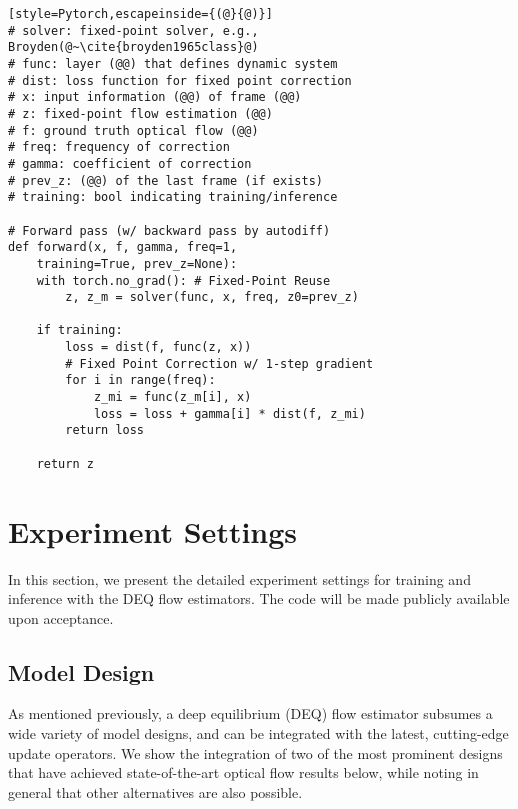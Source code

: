 \documentclass[10pt,twocolumn,letterpaper]{article}
\begin{document}
\begin{algorithm}[t]
\caption{DEQ flow (PyTorch-style). Note that we reuse the fixed point and perform fixed-point correction.}
\label{alg:deq-torch-short}
\begin{lstlisting}[style=Pytorch,escapeinside={(@}{@)}]
# solver: fixed-point solver, e.g., Broyden(@~\cite{broyden1965class}@)
# func: layer (@@) that defines dynamic system
# dist: loss function for fixed point correction
# x: input information (@@) of frame (@@)
# z: fixed-point flow estimation (@@)
# f: ground truth optical flow (@@)
# freq: frequency of correction
# gamma: coefficient of correction
# prev_z: (@@) of the last frame (if exists)
# training: bool indicating training/inference

# Forward pass (w/ backward pass by autodiff)
def forward(x, f, gamma, freq=1, 
    training=True, prev_z=None):
    with torch.no_grad(): # Fixed-Point Reuse
        z, z_m = solver(func, x, freq, z0=prev_z) 
        
    if training:
        loss = dist(f, func(z, x))
        # Fixed Point Correction w/ 1-step gradient
        for i in range(freq):
            z_mi = func(z_m[i], x)
            loss = loss + gamma[i] * dist(f, z_mi)
        return loss
        
    return z
\end{lstlisting}
\vspace{-0.1cm}
\end{algorithm}


\section{Experiment Settings}
In this section, we present the detailed experiment settings for training and inference with the DEQ flow estimators. The code will be made publicly available upon acceptance.

\subsection{Model Design}

As mentioned previously, a deep equilibrium (DEQ) flow estimator subsumes a wide variety of model designs, and can be integrated with the latest, cutting-edge update operators. We show the integration of two of the most prominent designs that have achieved state-of-the-art optical flow results below, while noting in general that other alternatives are also possible.
\end{document}
